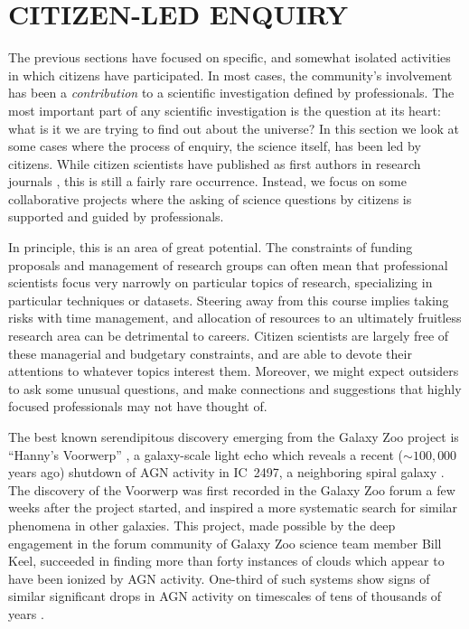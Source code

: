 \documentclass{ar2e}
\def\CaseStudy#1{\noindent{\it\bf #1 \,\,\,\,}}
\begin{document}

\section{CITIZEN-LED ENQUIRY}
\label{sec:explore}

The previous sections have focused on specific, and somewhat  isolated
activities in which citizens have participated. In most cases, the community's
involvement has been a {\it contribution} to a scientific investigation defined
by professionals. The most important part of any scientific investigation is the
question at its heart: what is it we are trying to find out about the universe?
In this section we look at some cases where the process of enquiry, the science
itself, has been led by citizens. While citizen scientists have published as
first authors in research journals \citep[see e.g.]{Hui2013,Liang2014},  this is
still a fairly rare occurrence. Instead, we focus on some collaborative projects
where the asking of science questions by citizens is supported and guided by
professionals.

In principle, this is an area of great potential. The constraints of funding
proposals and management of research groups can often mean that professional
scientists focus very narrowly on particular topics of research, specializing in
particular techniques or datasets.  Steering away from this course implies
taking risks with time management, and allocation of resources to an ultimately
fruitless research area can be detrimental to careers.  Citizen scientists are
largely free of these managerial and budgetary constraints, and are able to
devote their attentions to whatever topics interest them. Moreover, we might
expect outsiders to ask some unusual questions, and make connections and
suggestions that highly focused professionals may not have thought of. 



\CaseStudy{The Galaxy Zoo Forum.} 

The best known serendipitous discovery emerging from the Galaxy Zoo project is
``Hanny's Voorwerp'' \citep{Lintott++2009}, a galaxy-scale light echo which
reveals a recent ($\sim100,000$ years ago)  shutdown of AGN activity in IC~2497, 
a neighboring spiral galaxy \citep{Keel++2012}. 
The discovery of the Voorwerp was first
recorded in the Galaxy Zoo forum a few weeks after the project started, and
inspired a more systematic search for similar phenomena in other galaxies. This
project, made possible by the deep engagement in the forum community of Galaxy
Zoo science team member Bill Keel, succeeded in finding more than forty
instances of clouds which appear to have been ionized by AGN activity. 
One-third of such systems show signs of similar significant drops in AGN activity on
timescales of tens of thousands of years \citep{KeelAGN}.
\end{document}
